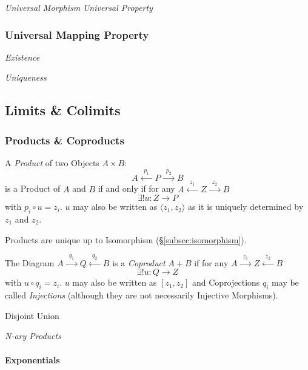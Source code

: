 \emph{Universal Morphism} \emph{Universal Property}

\subsubsection{Universal Mapping Property}
\label{subsec:universal_mapping_property}

\emph{Existence}

\emph{Uniqueness}

\subsection{Limits \& Colimits}\label{subsec:category_limits}


\subsubsection{Products \& Coproducts}\label{subsec:product_diagram}

A \emph{Product} of two Objects $A \times B$:
\[
    A \xleftarrow{\;\;p_1\;\;} P \xrightarrow{\;\;p_2\;\;} B
\]
is a Product of $A$ and $B$ if and only if for any $A
\xleftarrow{\;\;z_1\;\;} Z \xrightarrow{\;\;z_2\;\;} B$
\[
    \exists!u : Z \rightarrow P
\]
with $p_i \circ u = z_i$. $u$ may also be written as $\langle z_1, z_2
\rangle$ as it is uniquely determined by $z_1$ and $z_2$.

Products are unique up to Isomorphism (\S\ref{subsec:isomorphism}).

The Diagram $A \xrightarrow{\;\;q_1\;\;} Q \xleftarrow{\;\;q_2\;\;} B$
is a \emph{Coproduct} $A + B$ if for any $A \xrightarrow{\;\;z_1\;\;} Z
\xleftarrow{\;\;z_2\;\;} B$
\[
    \exists!u : Q \rightarrow Z
\]
with $u \circ q_i = z_i$. $u$ may also be written as $[ z_1, z_2 ]$
and Coprojections $q_i$ may be called \emph{Injections} (although they
are not necessarily Injective Morphisms).

Disjoint Union %

\emph{N-ary Products}

\paragraph{Exponentials}\label{subsec:category_exponential}

